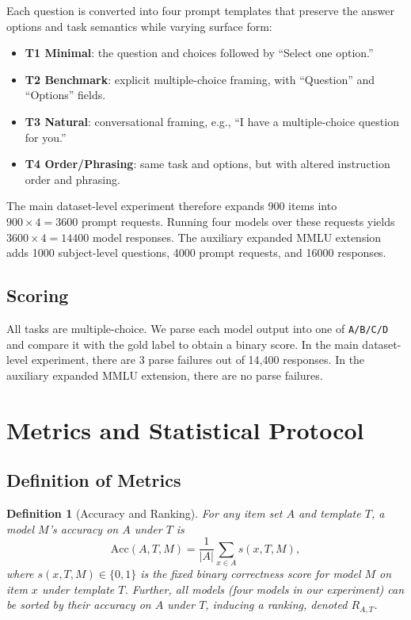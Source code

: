 \documentclass[11pt]{article}
\newtheorem{definition}{Definition}
\begin{document}
Each question is converted into four prompt templates that preserve the answer options and task semantics while varying surface form:
\begin{itemize}[leftmargin=*]
    \item \textbf{T1 Minimal}: the question and choices followed by ``Select one option.''
    \item \textbf{T2 Benchmark}: explicit multiple-choice framing, with ``Question'' and ``Options'' fields.
    \item \textbf{T3 Natural}: conversational framing, e.g., ``I have a multiple-choice question for you.''
    \item \textbf{T4 Order/Phrasing}: same task and options, but with altered instruction order and phrasing.
\end{itemize}

The main dataset-level experiment therefore expands 900 items into $900 \times 4 = 3600$ prompt requests. Running four models over these requests yields $3600 \times 4 = 14400$ model responses. The auxiliary expanded MMLU extension adds 1000 subject-level questions, 4000 prompt requests, and 16000 responses.

\subsection{Scoring}

All tasks are multiple-choice. We parse each model output into one of \texttt{A/B/C/D} and compare it with the gold label to obtain a binary score. In the main dataset-level experiment, there are 3 parse failures out of 14,400 responses. In the auxiliary expanded MMLU extension, there are no parse failures.

\section{Metrics and Statistical Protocol}

\subsection{Definition of Metrics}

\begin{definition}[Accuracy and Ranking]
    For any item set $A$ and template $T$, a model $M$'s accuracy on $A$ under $T$ is
    \[
    \mathrm{Acc}(A,T,M) = \frac{1}{|A|}\sum_{x\in A} s(x,T,M),
    \]
    where $s(x,T,M)\in\{0,1\}$ is the fixed binary correctness score for model $M$ on item $x$ under template $T$. Further, all models (four models in our experiment) can be sorted by their accuracy on $A$ under $T$, inducing a ranking, denoted $R_{A,T}$.
\end{definition}
\end{document}
